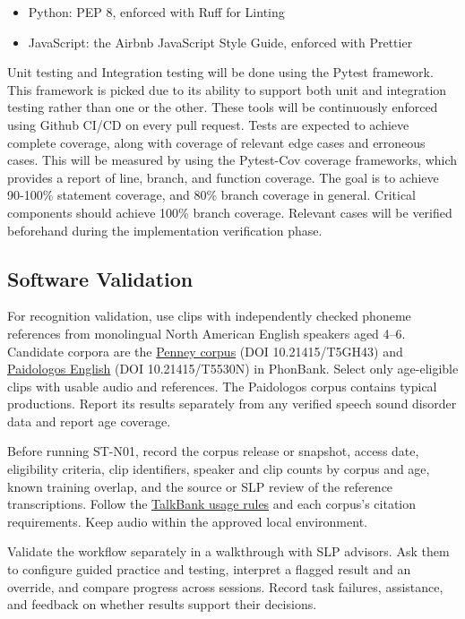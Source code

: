 \documentclass[12pt, titlepage]{article}
\begin{document}
\begin{itemize}
  \item Python: PEP 8, enforced with Ruff for Linting
  \item JavaScript: the Airbnb JavaScript Style Guide, enforced with Prettier
\end{itemize}

Unit testing and Integration testing will be done using the Pytest framework. 
This framework is picked due to its ability to support both unit and 
integration testing rather than one or the other. These tools will be 
continuously enforced using Github CI/CD on every pull request. Tests are 
expected to achieve complete coverage, along with coverage of relevant edge 
cases and erroneous cases. This will be measured by using the Pytest-Cov 
coverage frameworks, which provides a report of line, branch, and function 
coverage. The goal is to achieve 90-100\% statement coverage, and 80\% branch 
coverage in general. Critical components should achieve 100\% branch coverage. 
Relevant cases will be verified beforehand during the implementation 
verification phase. 


\subsection{Software Validation}

For recognition validation, use clips with independently checked phoneme
references from monolingual North American English speakers aged 4--6.
Candidate corpora are the \href{https://talkbank.org/phon/access/Eng-NA/Penney.html}{Penney corpus} (DOI 10.21415/T5GH43)
and \href{https://talkbank.org/phon/access/Eng-NA/PaidoEnglish.html}{Paidologos English} (DOI 10.21415/T5530N) in PhonBank.
Select only age-eligible clips with usable audio and references. The
Paidologos corpus contains typical productions. Report its results separately
from any verified speech sound disorder data and report age coverage.

Before running ST-N01, record the corpus release or snapshot, access date,
eligibility criteria, clip identifiers, speaker and clip counts by corpus
and age, known training overlap, and the source or SLP review of the
reference transcriptions. Follow the \href{https://talkbank.org/0share/rules.html}{TalkBank usage rules}
and each corpus's citation requirements. Keep audio within the approved
local environment.

Validate the workflow separately in a walkthrough with SLP advisors. Ask
them to configure guided practice and testing, interpret a flagged result
and an override, and compare progress across sessions. Record task failures,
assistance, and feedback on whether results support their decisions.
\end{document}
